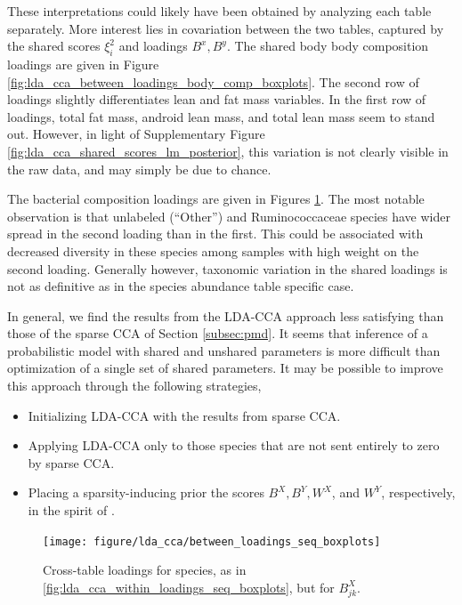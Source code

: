 \documentclass[14pt]{extarticle}
\begin{document}
These interpretations could likely have been obtained by analyzing each table
separately. More interest lies in covariation between the two tables, captured
by the shared scores $\xi_{i}^{2}$ and loadings $B^{x}, B^{y}$. The shared body
body composition loadings are given in Figure
\ref{fig:lda_cca_between_loadings_body_comp_boxplots}. The second row of loadings slightly
differentiates lean and fat mass variables. In the first row of loadings, total
fat mass, android lean mass, and total lean mass seem to stand out. However, in
light of Supplementary Figure \ref{fig:lda_cca_shared_scores_lm_posterior}, this
variation is not clearly visible in the raw data, and may simply be due to
chance.

The bacterial composition loadings are given in Figures
\ref{fig:lda_cca_between_loadings_seq_boxplots}. The most notable observation is
that unlabeled (``Other'') and Ruminococcaceae species have wider spread in the
second loading than in the first. This could be associated with decreased
diversity in these species among samples with high weight on the second loading.
Generally however, taxonomic variation in the shared loadings is not as
definitive as in the species abundance table specific case.

In general, we find the results from the LDA-CCA approach less satisfying than
those of the sparse CCA of Section \ref{subsec:pmd}. It seems that inference of
a probabilistic model with shared and unshared parameters is more difficult than
optimization of a single set of shared parameters. It may be possible to improve
this approach through the following strategies,

\begin{itemize}
\item Initializing LDA-CCA with the results from sparse CCA.
\item Applying LDA-CCA only to those species that are not sent entirely to zero by
  sparse CCA.
\item Placing a sparsity-inducing prior the scores $B^{X}, B^{Y}, W^{X}$, and
  $W^{Y}$, respectively, in the spirit of \citep{archambeau2009sparse}.
\end{itemize}

\begin{figure}
  \centering
  \texttt{[image: figure/lda\_cca/between\_loadings\_seq\_boxplots]}
  \caption{Cross-table loadings for species, as in
    \ref{fig:lda_cca_within_loadings_seq_boxplots}, but for
    $B^{X}_{jk}$. \label{fig:lda_cca_between_loadings_seq_boxplots} }
\end{figure}
\end{document}
